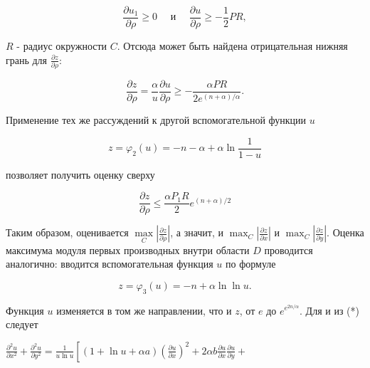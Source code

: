 \documentclass[10pt]{article}
\begin{document}
\[

\frac{\partial u_{1}}{\partial \rho} \geqslant 0 \quad \text { и } \quad \frac{\partial u}{\partial \rho} \geqslant-\frac{1}{2} P R,

\]



$R$ - радиус окружности $C$. Отсюда может быть найдена отрицательная нижняя грань для $\frac{\partial z}{\partial \rho}:$



\[

\frac{\partial z}{\partial \rho}=\frac{\alpha}{u} \frac{\partial u}{\partial \rho} \geqslant-\frac{\alpha P R}{2 e^{(n+\alpha) / \alpha}} .

\]



Применение тех же рассуждений к другой вспомогательной функции $u$



\[

z=\varphi_{2}(u)=-n-\alpha+\alpha \ln \frac{1}{1-u}

\]



позволяет получить оценку сверху



\[

\frac{\partial z}{\partial \rho} \leqslant \frac{\alpha P_{1} R}{2} e^{(n+\alpha) / 2}

\]



Таким образом, оценивается $\underset{C}{\max }\left|\frac{\partial z}{\partial \rho}\right|$, а значит, и $\max _{C}\left|\frac{\partial z}{\partial x}\right|$ и $\max _{C}\left|\frac{\partial z}{\partial y}\right|$. Оценка максимума модуля первых производных внутри области $D$ проводится аналогично: вводится вспомогательная функция $u$ по формуле



\[

z=\varphi_{3}(u)=-n+\alpha \ln \ln u .

\]



Функция $u$ изменяется в том же направлении, что и $z$, от $e$ до $e^{e^{2 n / \alpha}}$. Для $и$ из (*) следует



$\frac{\partial^{2} u}{\partial x^{2}}+\frac{\partial^{2} u}{\partial y^{2}}=\frac{1}{u \ln u}\left[(1+\ln u+\alpha a)\left(\frac{\partial u}{\partial x}\right)^{2}+2 \alpha b \frac{\partial u}{\partial x} \frac{\partial u}{\partial y}+\right.$
\end{document}

